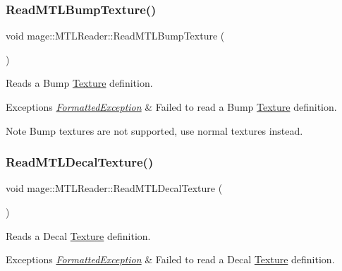 \subsubsection{\texorpdfstring{Read\+M\+T\+L\+Bump\+Texture()}{ReadMTLBumpTexture()}}
{\footnotesize\ttfamily void mage\+::\+M\+T\+L\+Reader\+::\+Read\+M\+T\+L\+Bump\+Texture (\begin{DoxyParamCaption}{ }\end{DoxyParamCaption})\hspace{0.3cm}{\ttfamily [private]}}

Reads a Bump \hyperlink{classmage_1_1_texture}{Texture} definition.


\begin{DoxyExceptions}{Exceptions}
{\em \hyperlink{structmage_1_1_formatted_exception}{Formatted\+Exception}} & Failed to read a Bump \hyperlink{classmage_1_1_texture}{Texture} definition. \\
\hline
\end{DoxyExceptions}
\begin{DoxyNote}{Note}
Bump textures are not supported, use normal textures instead. 
\end{DoxyNote}
\hypertarget{classmage_1_1_m_t_l_reader_a578df3a55c79fba9d46616791b2e5539}{}\label{classmage_1_1_m_t_l_reader_a578df3a55c79fba9d46616791b2e5539} 
\subsubsection{\texorpdfstring{Read\+M\+T\+L\+Decal\+Texture()}{ReadMTLDecalTexture()}}
{\footnotesize\ttfamily void mage\+::\+M\+T\+L\+Reader\+::\+Read\+M\+T\+L\+Decal\+Texture (\begin{DoxyParamCaption}{ }\end{DoxyParamCaption})\hspace{0.3cm}{\ttfamily [private]}}

Reads a Decal \hyperlink{classmage_1_1_texture}{Texture} definition.


\begin{DoxyExceptions}{Exceptions}
{\em \hyperlink{structmage_1_1_formatted_exception}{Formatted\+Exception}} & Failed to read a Decal \hyperlink{classmage_1_1_texture}{Texture} definition. \\
\hline
\end{DoxyExceptions}
\hypertarget{classmage_1_1_m_t_l_reader_accd087a8e5b2d489b83f70ecf0fe0d18}{}\label{classmage_1_1_m_t_l_reader_accd087a8e5b2d489b83f70ecf0fe0d18} 

